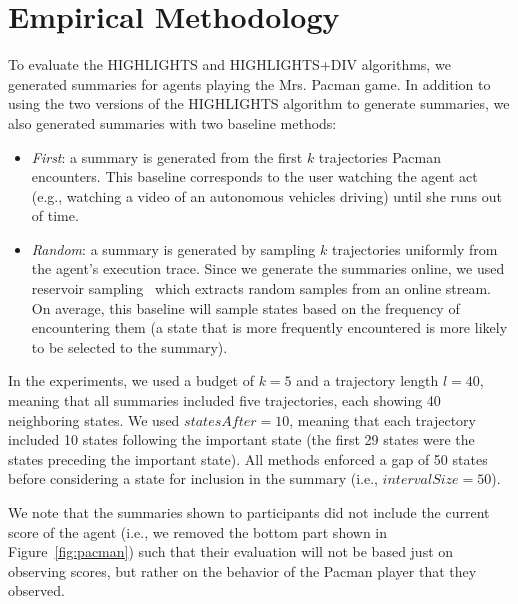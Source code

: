 \section{Empirical Methodology}
\label{sec:empirical}
To evaluate the HIGHLIGHTS and HIGHLIGHTS+DIV algorithms, we generated summaries for agents playing the Mrs. Pacman game.  
In addition to using the two versions of the HIGHLIGHTS algorithm to generate summaries, we also generated summaries with two baseline methods:
\begin{itemize}
\item \emph{First}: a summary is generated from the first $k$ trajectories Pacman encounters. This baseline corresponds to the user watching the agent act (e.g., watching a video of an autonomous vehicles driving) until she runs out of time.
\item \emph{Random}: a summary is generated by sampling $k$ trajectories uniformly from the agent's execution trace. Since we generate the summaries online, we used reservoir sampling~\cite{vitter1985random} which extracts random samples from an online stream. On average, this baseline will sample states based on the frequency of encountering them (a state that is more frequently encountered is more likely to be selected to the summary). 
\end{itemize}
In the experiments, we used a budget of $k = 5$ and a trajectory length $l=40$, meaning that all summaries included five trajectories, each showing 40 neighboring states. We used $statesAfter=10$, meaning that each trajectory included 10 states following the important state (the first 29 states were the states preceding the important state). All methods enforced a gap of 50 states before considering a state for inclusion in the summary (i.e., $intervalSize = 50$).

We note that the summaries shown to participants did not include the current score of the agent (i.e., we removed the bottom part shown in Figure~\ref{fig:pacman}) such that their evaluation will not be based just on observing scores, but rather on the behavior of the Pacman player that they observed. 

